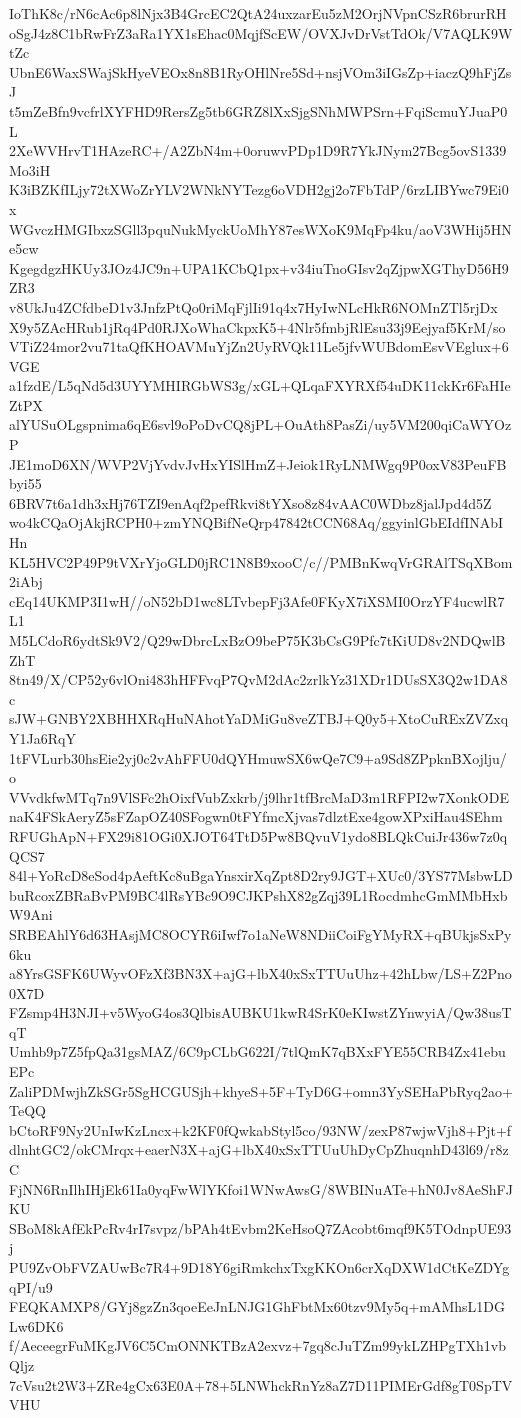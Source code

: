 IoThK8c/rN6cAc6p8lNjx3B4GrcEC2QtA24uxzarEu5zM2OrjNVpnCSzR6brurRH
oSgJ4z8C1bRwFrZ3aRa1YX1sEhac0MqjfScEW/OVXJvDrVstTdOk/V7AQLK9WtZc
UbnE6WaxSWajSkHyeVEOx8n8B1RyOHlNre5Sd+nsjVOm3iIGsZp+iaczQ9hFjZsJ
t5mZeBfn9vcfrlXYFHD9RersZg5tb6GRZ8lXxSjgSNhMWPSrn+FqiScmuYJuaP0L
2XeWVHrvT1HAzeRC+/A2ZbN4m+0oruwvPDp1D9R7YkJNym27Bcg5ovS1339Mo3iH
K3iBZKfILjy72tXWoZrYLV2WNkNYTezg6oVDH2gj2o7FbTdP/6rzLIBYwc79Ei0x
WGvczHMGIbxzSGll3pquNukMyckUoMhY87esWXoK9MqFp4ku/aoV3WHij5HNe5cw
KgegdgzHKUy3JOz4JC9n+UPA1KCbQ1px+v34iuTnoGIsv2qZjpwXGThyD56H9ZR3
v8UkJu4ZCfdbeD1v3JnfzPtQo0riMqFjlIi91q4x7HyIwNLcHkR6NOMnZTl5rjDx
X9y5ZAcHRub1jRq4Pd0RJXoWhaCkpxK5+4Nlr5fmbjRlEsu33j9Eejyaf5KrM/so
VTiZ24mor2vu71taQfKHOAVMuYjZn2UyRVQk11Le5jfvWUBdomEsvVEglux+6VGE
a1fzdE/L5qNd5d3UYYMHIRGbWS3g/xGL+QLqaFXYRXf54uDK11ckKr6FaHIeZtPX
alYUSuOLgspnima6qE6svl9oPoDvCQ8jPL+OuAth8PasZi/uy5VM200qiCaWYOzP
JE1moD6XN/WVP2VjYvdvJvHxYISlHmZ+Jeiok1RyLNMWgq9P0oxV83PeuFBbyi55
6BRV7t6a1dh3xHj76TZI9enAqf2pefRkvi8tYXso8z84vAAC0WDbz8jalJpd4d5Z
wo4kCQaOjAkjRCPH0+zmYNQBifNeQrp47842tCCN68Aq/ggyinlGbEIdfINAbIHn
KL5HVC2P49P9tVXrYjoGLD0jRC1N8B9xooC/c//PMBnKwqVrGRAlTSqXBom2iAbj
cEq14UKMP3I1wH//oN52bD1wc8LTvbepFj3Afe0FKyX7iXSMI0OrzYF4ucwlR7L1
M5LCdoR6ydtSk9V2/Q29wDbrcLxBzO9beP75K3bCsG9Pfc7tKiUD8v2NDQwlBZhT
8tn49/X/CP52y6vlOni483hHFFvqP7QvM2dAc2zrlkYz31XDr1DUsSX3Q2w1DA8c
sJW+GNBY2XBHHXRqHuNAhotYaDMiGu8veZTBJ+Q0y5+XtoCuRExZVZxqY1Ja6RqY
1tFVLurb30hsEie2yj0c2vAhFFU0dQYHmuwSX6wQe7C9+a9Sd8ZPpknBXojlju/o
VVvdkfwMTq7n9VlSFc2hOixfVubZxkrb/j9lhr1tfBrcMaD3m1RFPI2w7XonkODE
naK4FSkAeryZ5sFZapOZ40SFogwn0tFYfmcXjvas7dlztExe4gowXPxiHau4SEhm
RFUGhApN+FX29i81OGi0XJOT64TtD5Pw8BQvuV1ydo8BLQkCuiJr436w7z0qQCS7
84l+YoRcD8eSod4pAeftKc8uBgaYnsxirXqZpt8D2ry9JGT+XUc0/3YS77MsbwLD
buRcoxZBRaBvPM9BC4lRsYBc9O9CJKPshX82gZqj39L1RocdmhcGmMMbHxbW9Ani
SRBEAhlY6d63HAsjMC8OCYR6iIwf7o1aNeW8NDiiCoiFgYMyRX+qBUkjsSxPy6ku
a8YrsGSFK6UWyvOFzXf3BN3X+ajG+lbX40xSxTTUuUhz+42hLbw/LS+Z2Pno0X7D
FZsmp4H3NJI+v5WyoG4os3QlbisAUBKU1kwR4SrK0eKIwstZYnwyiA/Qw38usTqT
Umhb9p7Z5fpQa31gsMAZ/6C9pCLbG622I/7tlQmK7qBXxFYE55CRB4Zx41ebuEPc
ZaliPDMwjhZkSGr5SgHCGUSjh+khyeS+5F+TyD6G+omn3YySEHaPbRyq2ao+TeQQ
bCtoRF9Ny2UnIwKzLncx+k2KF0fQwkabStyl5co/93NW/zexP87wjwVjh8+Pjt+f
dlnhtGC2/okCMrqx+eaerN3X+ajG+lbX40xSxTTUuUhDyCpZhuqnhD43l69/r8zC
FjNN6RnIlhIHjEk61Ia0yqFwWlYKfoi1WNwAwsG/8WBINuATe+hN0Jv8AeShFJKU
SBoM8kAfEkPcRv4rI7svpz/bPAh4tEvbm2KeHsoQ7ZAcobt6mqf9K5TOdnpUE93j
PU9ZvObFVZAUwBc7R4+9D18Y6giRmkchxTxgKKOn6crXqDXW1dCtKeZDYgqPI/u9
FEQKAMXP8/GYj8gzZn3qoeEeJnLNJG1GhFbtMx60tzv9My5q+mAMhsL1DGLw6DK6
f/AeceegrFuMKgJV6C5CmONNKTBzA2exvz+7gq8cJuTZm99ykLZHPgTXh1vbQljz
7cVsu2t2W3+ZRe4gCx63E0A+78+5LNWhckRnYz8aZ7D11PIMErGdf8gT0SpTVVHU
